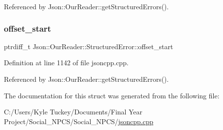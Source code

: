 Referenced by Json\+::\+Our\+Reader\+::get\+Structured\+Errors().

\mbox{\label{struct_json_1_1_our_reader_1_1_structured_error_a102677698afb8177c985e72dafe72b15}} 
\subsubsection{\texorpdfstring{offset\+\_\+start}{offset\_start}}
{\footnotesize\ttfamily ptrdiff\+\_\+t Json\+::\+Our\+Reader\+::\+Structured\+Error\+::offset\+\_\+start}



Definition at line 1142 of file jsoncpp.\+cpp.



Referenced by Json\+::\+Our\+Reader\+::get\+Structured\+Errors().



The documentation for this struct was generated from the following file\+:\begin{DoxyCompactItemize}
\item 
C\+:/\+Users/\+Kyle Tuckey/\+Documents/\+Final Year Project/\+Social\+\_\+\+N\+P\+C\+S/\+Social\+\_\+\+N\+P\+C\+S/\hyperlink{jsoncpp_8cpp}{jsoncpp.\+cpp}\end{DoxyCompactItemize}
